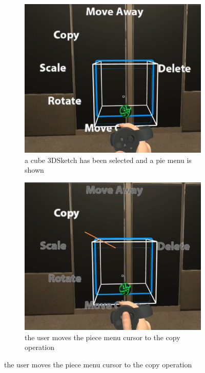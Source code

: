 \documentclass[chi_draft]{sigchi}
\begin{document}
\begin{figure}
    \centering
    \begin{subfigure}[b]{0.4\columnwidth}
        \includegraphics[width=1\columnwidth]{piemenu1.png}
        \caption{a cube 3DSketch has been selected and a pie menu is shown}
    \end{subfigure}
    \begin{subfigure}[b]{0.4\columnwidth}
        \includegraphics[width=1\columnwidth]{piemenu2.png}
        \caption{the user moves the piece menu cursor to the copy operation}

\end{subfigure}
\end{figure}
\end{document}
